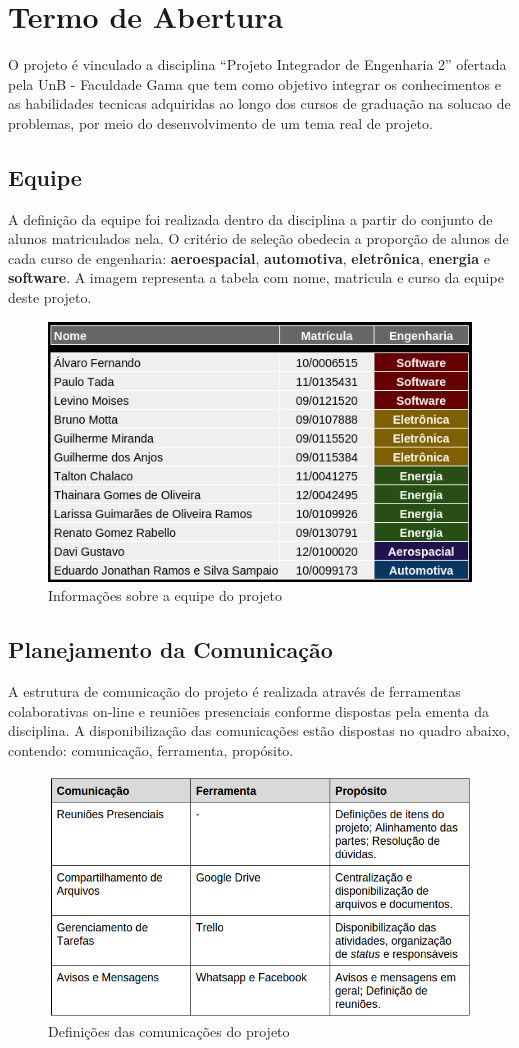 \section{Termo de Abertura}
O projeto é vinculado a disciplina “Projeto Integrador de Engenharia 2” ofertada pela UnB - Faculdade Gama que tem como objetivo integrar os conhecimentos e as habilidades tecnicas adquiridas ao longo dos cursos de graduação na solucao de problemas, por meio do desenvolvimento de um tema real de projeto.

\subsection{Equipe}

A definição da equipe foi realizada dentro da disciplina a partir do conjunto de alunos matriculados nela. O critério de seleção obedecia a proporção de alunos de cada curso de engenharia: \textbf{aeroespacial}, \textbf{automotiva}, \textbf{eletrônica}, \textbf{energia} e \textbf{software}. A imagem representa a tabela com nome, matricula e curso da equipe deste projeto.

\begin{figure}[h]
  \centering
  \includegraphics[width=.6\textwidth]{edit/img/equipe.png}
  \caption{Informações sobre a equipe do projeto}
  \label{equipe}
\end{figure}

\subsection{Planejamento da Comunicação}
A estrutura de comunicação do projeto é realizada através de ferramentas colaborativas on-line e reuniões presenciais conforme dispostas pela ementa da disciplina. A disponibilização das comunicações estão dispostas no quadro abaixo, contendo: comunicação, ferramenta, propósito.

\begin{figure}[h]
  \centering
  \includegraphics[width=.7\textwidth]{edit/img/comunicacao.png}
  \caption{Definições das comunicações do projeto}
  \label{comunicacao}
\end{figure}
